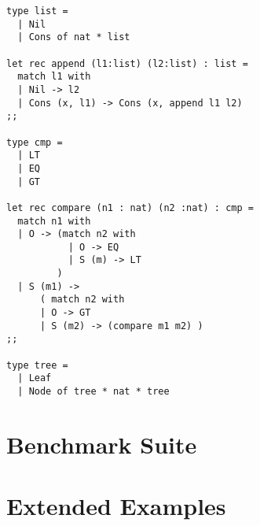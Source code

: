 {\begin{verbatim}
type list =
  | Nil
  | Cons of nat * list

let rec append (l1:list) (l2:list) : list =
  match l1 with
  | Nil -> l2
  | Cons (x, l1) -> Cons (x, append l1 l2)
;;

type cmp =
  | LT
  | EQ
  | GT

let rec compare (n1 : nat) (n2 :nat) : cmp =
  match n1 with
  | O -> (match n2 with
           | O -> EQ
           | S (m) -> LT
         )
  | S (m1) ->
      ( match n2 with
      | O -> GT
      | S (m2) -> (compare m1 m2) )
;;

type tree =
  | Leaf
  | Node of tree * nat * tree
\end{verbatim}

\section{Benchmark Suite}



\section{Extended Examples}



}
